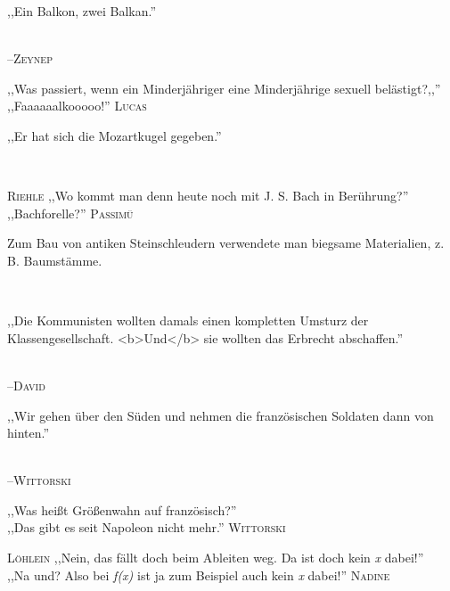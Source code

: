 \vspace{3mm}
{\raggedright ,,Ein Balkon, zwei Balkan.''}\\
\raggedleft \textsc{\footnotesize --\/Zeynep}\\

\vspace{3mm}
\hangindent=0.7cm
\raggedright \textsc{\footnotesize  } ,,Was passiert, wenn ein Minderjähriger eine Minderjährige sexuell belästigt?,,''\\
\raggedleft ,,Faaaaaalkooooo!'' \textsc{\footnotesize Lucas}\\

\vspace{3mm}
{\raggedright ,,Er hat sich die Mozartkugel gegeben.''}\\

\vspace{3mm}
\hangindent=0.7cm
\raggedright \textsc{\footnotesize Riehle} ,,Wo kommt man denn heute noch mit J. S. Bach in Berührung?''\\
\raggedleft ,,Bachforelle?'' \textsc{\footnotesize Passimü}\\

\vspace{3mm}
{\raggedright Zum Bau von antiken Steinschleudern verwendete man biegsame Materialien, z. B. Baumstämme.}\\

\vspace{3mm}
{\raggedright ,,Die Kommunisten wollten damals einen kompletten Umsturz der Klassengesellschaft. <b>Und</b> sie wollten das Erbrecht abschaffen.''}\\
\raggedleft \textsc{\footnotesize --\/David}\\

\vspace{3mm}
{\raggedright ,,Wir gehen über den Süden und nehmen die französischen Soldaten dann von hinten.''}\\
\raggedleft \textsc{\footnotesize --\/Wittorski}\\

\vspace{3mm}
\hangindent=0.7cm
\raggedright \textsc{\footnotesize  } ,,Was heißt Größenwahn auf französisch?''\\
\raggedleft ,,Das gibt es seit Napoleon nicht mehr.'' \textsc{\footnotesize Wittorski}\\

\vspace{3mm}
\hangindent=0.7cm
\raggedright \textsc{\footnotesize Löhlein} ,,Nein, das fällt doch beim Ableiten weg. Da ist doch kein \emph{x} dabei!''\\
\raggedleft ,,Na und? Also bei \emph{f(x)} ist ja zum Beispiel auch kein \emph{x} dabei!'' \textsc{\footnotesize Nadine}\\

